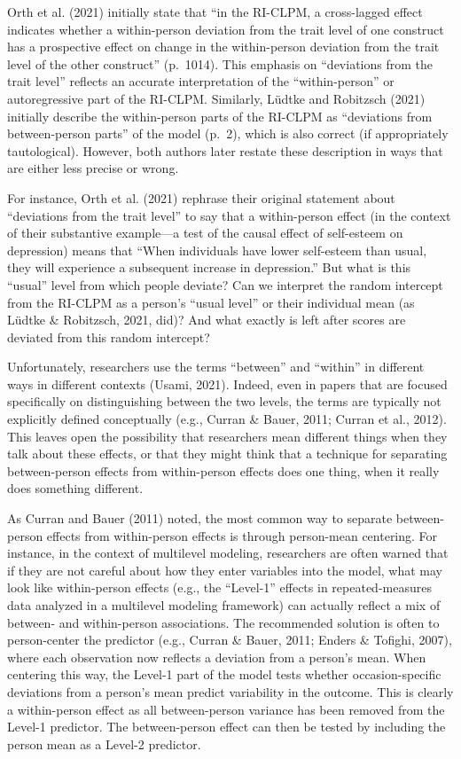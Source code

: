 \documentclass[
  english,
  man,floatsintext]{apa6}
\begin{document}
Orth et al. (2021) initially state that ``in the RI-CLPM, a cross-lagged effect indicates whether a within-person deviation from the trait level of one construct has a prospective effect on change in the within-person deviation from the trait level of the other construct'' (p.~1014). This emphasis on ``deviations from the trait level'' reflects an accurate interpretation of the ``within-person'' or autoregressive part of the RI-CLPM. Similarly, Lüdtke and Robitzsch (2021) initially describe the within-person parts of the RI-CLPM as ``deviations from between-person parts'' of the model (p.~2), which is also correct (if appropriately tautological). However, both authors later restate these description in ways that are either less precise or wrong.

For instance, Orth et al. (2021) rephrase their original statement about ``deviations from the trait level'' to say that a within-person effect (in the context of their substantive example---a test of the causal effect of self-esteem on depression) means that ``When individuals have lower self-esteem than usual, they will experience a subsequent increase in depression.'' But what is this ``usual'' level from which people deviate? Can we interpret the random intercept from the RI-CLPM as a person's ``usual level'' or their individual mean (as Lüdtke \& Robitzsch, 2021, did)? And what exactly is left after scores are deviated from this random intercept?

Unfortunately, researchers use the terms ``between'' and ``within'' in different ways in different contexts (Usami, 2021). Indeed, even in papers that are focused specifically on distinguishing between the two levels, the terms are typically not explicitly defined conceptually (e.g., Curran \& Bauer, 2011; Curran et al., 2012). This leaves open the possibility that researchers mean different things when they talk about these effects, or that they might think that a technique for separating between-person effects from within-person effects does one thing, when it really does something different.

As Curran and Bauer (2011) noted, the most common way to separate between-person effects from within-person effects is through person-mean centering. For instance, in the context of multilevel modeling, researchers are often warned that if they are not careful about how they enter variables into the model, what may look like within-person effects (e.g., the ``Level-1'' effects in repeated-measures data analyzed in a multilevel modeling framework) can actually reflect a mix of between- and within-person associations. The recommended solution is often to person-center the predictor (e.g., Curran \& Bauer, 2011; Enders \& Tofighi, 2007), where each observation now reflects a deviation from a person's mean. When centering this way, the Level-1 part of the model tests whether occasion-specific deviations from a person's mean predict variability in the outcome. This is clearly a within-person effect as all between-person variance has been removed from the Level-1 predictor. The between-person effect can then be tested by including the person mean as a Level-2 predictor.
\end{document}
